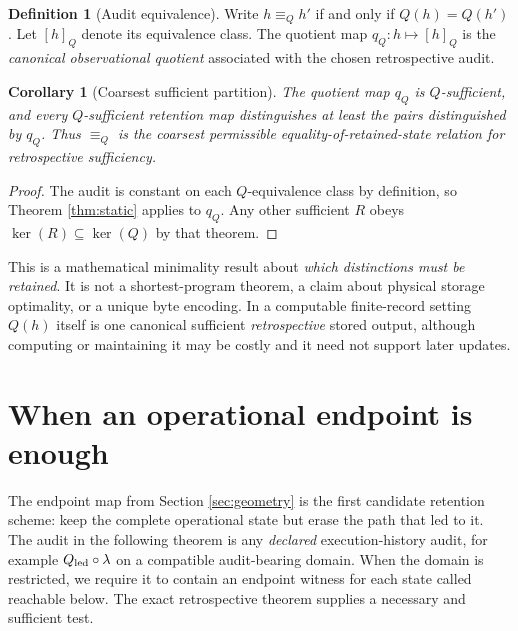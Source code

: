 \documentclass[11pt,letterpaper]{article}
\newtheorem{corollary}[theorem]{Corollary}
\theoremstyle{definition}
\newtheorem{definition}[theorem]{Definition}
\begin{document}
\begin{definition}[Audit equivalence]
Write $h\equiv_Q h'$ if and only if $Q(h)=Q(h')$. Let $[h]_Q$ denote its equivalence class. The quotient map $q_Q:h\mapsto[h]_Q$ is the \emph{canonical observational quotient} associated with the chosen retrospective audit.
\end{definition}

\begin{corollary}[Coarsest sufficient partition]\label{cor:quotient}
The quotient map $q_Q$ is $Q$-sufficient, and every $Q$-sufficient retention map distinguishes at least the pairs distinguished by $q_Q$. Thus $\equiv_Q$ is the coarsest permissible equality-of-retained-state relation for retrospective sufficiency.
\end{corollary}
\begin{proof}
The audit is constant on each $Q$-equivalence class by definition, so Theorem \ref{thm:static} applies to $q_Q$. Any other sufficient $R$ obeys $\ker(R)\subseteq\ker(Q)$ by that theorem.
\end{proof}

This is a mathematical minimality result about \emph{which distinctions must be retained}. It is not a shortest-program theorem, a claim about physical storage optimality, or a unique byte encoding. In a computable finite-record setting $Q(h)$ itself is one canonical sufficient \emph{retrospective} stored output, although computing or maintaining it may be costly and it need not support later updates.

\section{When an operational endpoint is enough}\label{sec:endpoint}
The endpoint map from Section \ref{sec:geometry} is the first candidate retention scheme: keep the complete operational state but erase the path that led to it. The audit in the following theorem is any \emph{declared} execution-history audit, for example $Q_{\rm led}\circ\lambda$ on a compatible audit-bearing domain. When the domain is restricted, we require it to contain an endpoint witness for each state called reachable below. The exact retrospective theorem supplies a necessary and sufficient test.
\end{document}
